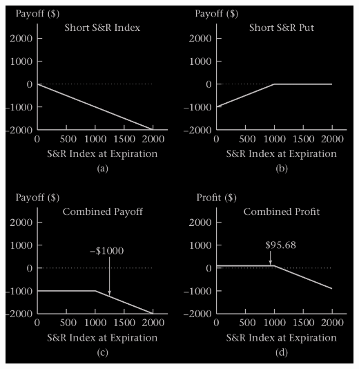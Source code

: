 \begin{frame}[fragile]
	\begin{center}
		\includegraphics[scale=0.25]{figs/Figure-3-5.png}
	\end{center}
\end{frame}
